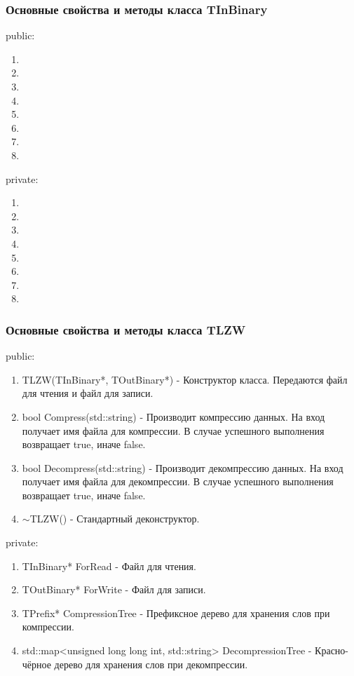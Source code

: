 \documentclass[12pt]{article}
\begin{document}
\subsubsection*{Основные свойства и методы класса TInBinary}%
\noindent
public:

\begin{enumerate}
	\item 
	\item 
	\item 
	\item 
	\item 
	\item 
	\item 
	\item 
\end{enumerate}
\noindent
private:

\begin{enumerate}
	\item 
	\item 
	\item 
	\item 
	\item 
	\item 
	\item 
	\item 
\end{enumerate}

\subsubsection*{Основные свойства и методы класса TLZW}
\noindent
public:

\begin{enumerate}
	\item TLZW(TInBinary*, TOutBinary*) - Конструктор класса. Передаются файл для чтения и файл для записи.
	\item bool Compress(std::string) - Производит компрессию данных. На вход получает имя файла для компрессии. В случае успешного выполнения возвращает true, иначе false.
	\item bool Decompress(std::string) - Производит декомпрессию данных. На вход получает имя файла для декомпрессии. В случае успешного выполнения возвращает true, иначе false.
	\item $\sim$TLZW() - Стандартный деконструктор.
\end{enumerate}
\noindent
private:

\begin{enumerate}
	\item TInBinary* ForRead - Файл для чтения.
	\item TOutBinary* ForWrite - Файл для записи.
	\item TPrefix* CompressionTree - Префиксное дерево для хранения слов при компрессии.
	\item std::map<unsigned long long int, std::string> DecompressionTree - Красно-чёрное дерево для хранения слов при декомпрессии.
\end{enumerate}
\end{document}
